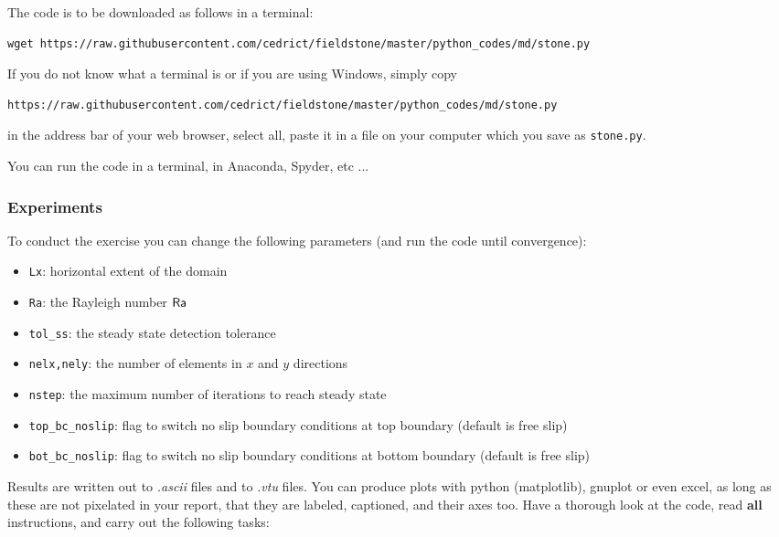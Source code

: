 The code is to be downloaded as follows in a terminal:
{\small
\begin{verbatim}
wget https://raw.githubusercontent.com/cedrict/fieldstone/master/python_codes/md/stone.py
\end{verbatim}
}
If you do not know what a terminal is or if you are using Windows, simply copy 
{\small
\begin{verbatim}
https://raw.githubusercontent.com/cedrict/fieldstone/master/python_codes/md/stone.py
\end{verbatim}
}
in the address bar of your web browser, select all, paste it in a file on your computer which 
you save as {\tt stone.py}.

You can run the code in a terminal, in Anaconda, Spyder, etc ... 

\subsubsection{Experiments}

To conduct the exercise you can change the following parameters (and run the code until convergence):
\begin{itemize}
\item {\tt Lx}: horizontal extent of the domain
\item {\tt Ra}: the Rayleigh number ${\mathsf{Ra}}$
\item {\tt tol\_ss}: the steady state detection tolerance
\item {\tt nelx,nely}: the number of elements in $x$ and $y$ directions 
\item {\tt nstep}: the maximum number of iterations to reach steady state
\item {\tt top\_bc\_noslip}: flag to switch no slip boundary conditions at top boundary (default is free slip)
\item {\tt bot\_bc\_noslip}: flag to switch no slip boundary conditions at 
      bottom boundary (default is free slip)
\end{itemize}

Results are written out to {\sl .ascii} files and to {\sl .vtu} files. You can produce 
plots with python (matplotlib), gnuplot or even excel, as long as these are not pixelated in your report, 
that they are labeled, captioned, and their axes too.  
Have a thorough look at the code, read {\bf all} instructions, and carry out the following tasks:

